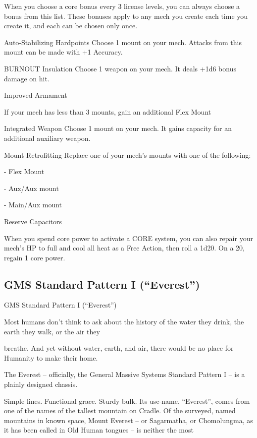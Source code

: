 When you choose a core bonus every 3 license levels, you can always choose a bonus from this  
list. These bonuses apply to any mech you create each time you create it, and each can be  
chosen only once.
 

Auto-Stabilizing Hardpoints  
Choose 1 mount on your mech. Attacks from this mount can be made with +1 Accuracy.
 

BURNOUT Insulation  
Choose 1 weapon on your mech. It deals +1d6 bonus damage on hit.
 

Improved Armament
 
If your mech has less than 3 mounts, gain an additional Flex Mount
 

Integrated Weapon  
Choose 1 mount on your mech. It gains capacity for an additional auxiliary weapon.
 

Mount Retrofitting  
Replace one of your mech’s mounts with one of the following:
 
	       - Flex Mount
 
	       - Aux/Aux mount
 
	       - Main/Aux mount
 

Reserve Capacitors
 
When you spend core power to activate a CORE system, you can also repair your mech’s HP to  
full and cool all heat as a Free Action, then roll a 1d20. On a 20, regain 1 core power.
 

                                                                                                          
\subsection{GMS Standard Pattern I (“Everest”)}

                                GMS Standard Pattern I (“Everest”)  

Most humans don’t think to ask about the history of the water they drink, the earth they walk, or the air they  

breathe. And yet without water, earth, and air, there would be no place for Humanity to make their home.   

The Everest -- officially, the General Massive Systems Standard Pattern I -- is a plainly designed chassis.  

Simple lines. Functional grace. Sturdy bulk. Its use-name, “Everest”, comes from one of the names of the  
tallest mountain on Cradle. Of the surveyed, named mountains in known space, Mount Everest -- or  
Sagarmatha, or Chomolungma, as it has been called in Old Human tongues -- is neither the most  

